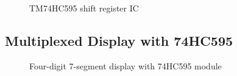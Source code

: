 \documentclass[a4paper,twoside]{report}
\begin{document}
\begin{figure}[H]
\caption{TM74HC595 shift register IC\protect\footnotemark}
\end{figure}


\subsection{Multiplexed Display with 74HC595}
\begin{figure}[H]
\centering
{}\qquad\qquad
{}
\caption{Four-digit 7-segment display with 74HC595 module}
\end{figure}
\end{document}
